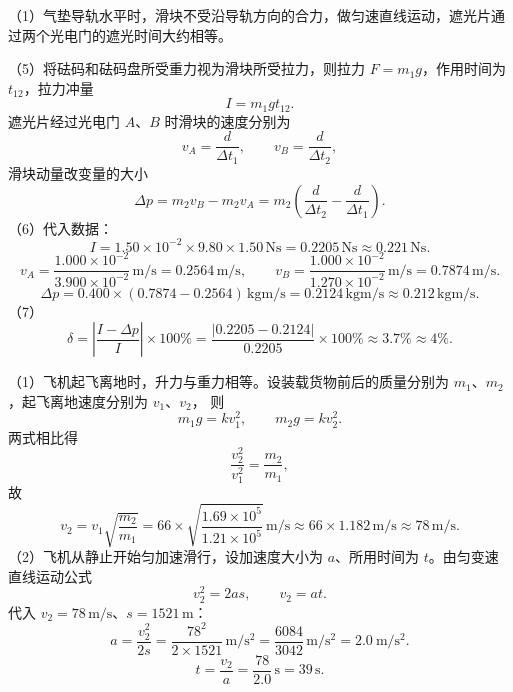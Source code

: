 \begin{answer}
（1）气垫导轨水平时，滑块不受沿导轨方向的合力，做匀速直线运动，遮光片通过两个光电门的遮光时间大约相等。

（5）将砝码和砝码盘所受重力视为滑块所受拉力，则拉力 $F=m_1g$，作用时间为 $t_{12}$，拉力冲量
\[
  I=m_1gt_{12}.
\]
遮光片经过光电门 $A$、$B$ 时滑块的速度分别为
\[
  v_A=\frac{d}{\Delta t_1},\qquad v_B=\frac{d}{\Delta t_2},
\]
滑块动量改变量的大小
\[
  \Delta p=m_2v_B-m_2v_A
        =m_2\left(\frac{d}{\Delta t_2}-\frac{d}{\Delta t_1}\right).
\]
（6）代入数据：
\[
  I=1.50\times10^{-2}\times9.80\times1.50\,\si{\newton\second}
   =0.2205\,\si{\newton\second}\approx0.221\,\si{\newton\second}.
\]
\[
  v_A=\frac{1.000\times10^{-2}}{3.900\times10^{-2}}\,\si{\metre\per\second}
     =0.2564\,\si{\metre\per\second},\qquad
  v_B=\frac{1.000\times10^{-2}}{1.270\times10^{-2}}\,\si{\metre\per\second}
     =0.7874\,\si{\metre\per\second}.
\]
\[
  \Delta p=0.400\times(0.7874-0.2564)\,\si{\kilogram\metre\per\second}
          =0.2124\,\si{\kilogram\metre\per\second}
          \approx0.212\,\si{\kilogram\metre\per\second}.
\]
（7）
\[
  \delta=\left|\frac{I-\Delta p}{I}\right|\times100\%
       =\frac{|0.2205-0.2124|}{0.2205}\times100\%
       \approx3.7\%\approx4\%.
\]
\end{answer}

\begin{answer}
（1）飞机起飞离地时，升力与重力相等。设装载货物前后的质量分别为 $m_1$、$m_2$，起飞离地速度分别为 $v_1$、$v_2$，
则
\[
  m_1g=kv_1^{2},\qquad m_2g=kv_2^{2}.
\]
两式相比得
\[
  \frac{v_2^{2}}{v_1^{2}}=\frac{m_2}{m_1},
\]
故
\[
  v_2=v_1\sqrt{\frac{m_2}{m_1}}
     =66\times\sqrt{\frac{1.69\times10^{5}}{1.21\times10^{5}}}\,\si{\metre\per\second}
     \approx66\times1.182\,\si{\metre\per\second}
     \approx78\,\si{\metre\per\second}.
\]
（2）飞机从静止开始匀加速滑行，设加速度大小为 $a$、所用时间为 $t$。由匀变速直线运动公式
\[
  v_2^{2}=2as,\qquad v_2=at.
\]
代入 $v_2=78\,\si{\metre\per\second}$、$s=1521\,\si{\metre}$：
\[
  a=\frac{v_2^{2}}{2s}
   =\frac{78^{2}}{2\times1521}\,\si{\metre\per\second\squared}
   =\frac{6084}{3042}\,\si{\metre\per\second\squared}
   =\SI{2.0}{\metre\per\second\squared}.
\]
\[
  t=\frac{v_2}{a}=\frac{78}{2.0}\,\si{\second}=39\,\si{\second}.
\]
\end{answer}

